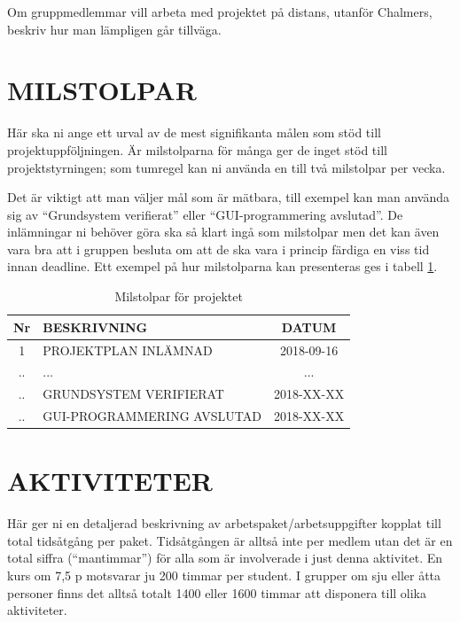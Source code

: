 \documentclass[a4paper]{article}
\begin{document}
Om gruppmedlemmar vill arbeta med projektet på distans, utanför
Chalmers, beskriv hur man lämpligen går tillväga.



\section{MILSTOLPAR}
\label{sec:milstolpar}


Här ska ni ange ett urval av de mest signifikanta målen som stöd till
projektuppföljningen. Är milstolparna för många ger de inget stöd till
projektstyrningen; som tumregel kan ni använda en till två milstolpar
per vecka.

Det är viktigt att man väljer mål som är mätbara, till exempel kan man
använda sig av “Grundsystem verifierat” eller “GUI-programmering
avslutad”. De inlämningar ni behöver göra ska så klart ingå som
milstolpar men det kan även vara bra att i gruppen besluta om att de ska
vara i princip färdiga en viss tid innan deadline. Ett exempel på hur
milstolparna kan presenteras ges i tabell \ref{tab:milstolpar}.
 
\begin{table}
    \begin{tabular}{|c|l|c|}
        \hline
        Nr & BESKRIVNING & DATUM \\
        \hline
        \hline                       
        1 & PROJEKTPLAN INLÄMNAD & 2018-09-16 \\
        \hline          
        .. & ... & ... \\
        \hline                                 
        .. & GRUNDSYSTEM VERIFIERAT & 2018-XX-XX \\    
        \hline     
        .. & GUI-PROGRAMMERING AVSLUTAD & 2018-XX-XX \\  
        \hline  
    \end{tabular}
    \caption{Milstolpar för projektet}
    \label{tab:milstolpar}
\end{table}



\section{AKTIVITETER}
\label{sec:sktiviteter}


Här ger ni en detaljerad beskrivning av arbetspaket/arbetsuppgifter
kopplat till total tidsåtgång per paket. Tidsåtgången är alltså inte per
medlem utan det är en total siffra (“mantimmar”) för alla som är
involverade i just denna aktivitet. En kurs om 7,5 p motsvarar ju 200
timmar per student. I grupper om sju eller åtta personer finns det
alltså totalt 1400 eller 1600 timmar att disponera till olika
aktiviteter.
\end{document}
